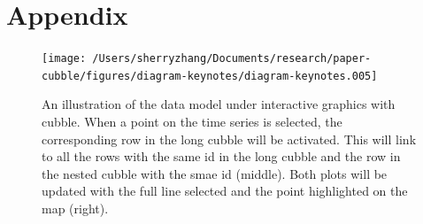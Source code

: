 \documentclass[
]{jss}
\begin{document}
\hypertarget{appendix}{%
\section{Appendix}\label{appendix}}

\begin{CodeChunk}
\begin{figure}

{\centering \texttt{[image: /Users/sherryzhang/Documents/research/paper-cubble/figures/diagram-keynotes/diagram-keynotes.005]} 

}

\caption[An illustration of the data model under interactive graphics with cubble]{An illustration of the data model under interactive graphics with cubble. When a point on the time series is selected, the corresponding row in the long cubble will be activated. This will link to all the rows with the same id in the long cubble and the row in the nested cubble with the smae id (middle). Both plots will be updated with the full line selected and the point highlighted on the map (right).}\label{fig:illu-interactive-2}
\end{figure}
\end{CodeChunk}


\end{document}
